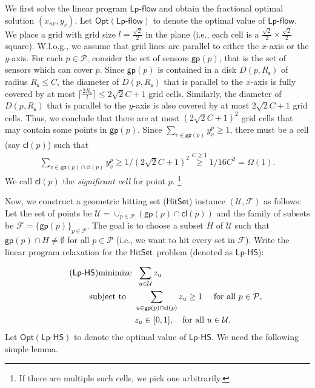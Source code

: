 \documentclass[11pt]{article}
\newcommand{\calF}{{\mathcal F}}
\newcommand{\calP}{{\mathcal P}}
\newcommand{\calU}{{\mathcal U}}
\newcommand{\opt}{\mathsf{Opt}}
\newcommand{\rednote}[1]{#1}
\newcommand{\hittingset}{$\mathsf{HitSet}$}
\newcommand{\lpflow}{\mathsf{Lp}\text{-}\mathsf{flow}}
\newcommand{\lphittingset}{\mathsf{Lp}\text{-}\mathsf{HS}}
\newcommand{\group}{\mathsf{gp}}
\newcommand{\cell}{\mathsf{cl}}
\newcommand{\Rs}{R_\mathsf{s}}
\begin{document}
We first solve the linear program $\lpflow$ and obtain the fractional optimal solution
$(x_{uv}, y_v)$.
Let $\opt(\lpflow)$ to denote the optimal value of $\lpflow$.
We place a grid with grid size $l=\frac{\sqrt{2}}{2}$ in the plane (i.e., each cell is a $\frac{\sqrt{2}}{2}\times \frac{\sqrt{2}}{2}$ square).
W.l.o.g., we assume that grid lines are parallel to either the $x$-axis or the $y$-axis.
For each $p\in \calP$, consider the set of sensors $\group(p)$, that is the set of sensors which can cover $p$.
Since $\group(p)$ is contained in a disk $D(p, \Rs)$ of radius $\Rs\leq C$, the diameter of $D(p,\Rs)$ that is parallel to the $x$-axis is fully covered by at most $\lceil \frac{2\Rs}{l} \rceil\leq 2\sqrt{2} C +1$ grid cells.
Similarly, the diameter of $D(p,\Rs)$ that is parallel to the $y$-axis is also covered by at most $2\sqrt{2} C +1$ grid cells.
Thus, we conclude that there are at most
\rednote{$(2\sqrt{2} C +1)^2$} grid cells that may contain some points in $\group(p)$.
Since  $\sum_{v\in \group(p)}y^p_v\geq 1$, there must be a cell (say $\cell(p)$) such that
\begin{align}
\label{eq:cellsum}
\sum_{v\in \group(p)\cap \cell(p)} y^p_v\geq 1/(2\sqrt{2} C +1)^2\stackrel{C\geq 1}{\geq} 1/16C^2 =\Omega(1).
\end{align}
We call $\cell(p)$ the {\em significant cell} for point $p$. 
\footnote{
	If there are multiple such cells, we pick one arbitrarily.
}


Now, we construct a geometric hitting set (\hittingset) instance $(\calU, \calF)$ as follows:
Let the set of points be
$
\calU=\cup_{p\in \calP} (\group(p)\cap\cell(p))
$
and  the family of subsets be
$
\calF=\{\group(p)\}_{p\in \calP}.
$
The goal is to choose a subset $H$ of $\calU$ such that
$\group(p)\cap H\ne \emptyset$ for all $p\in \calP$ (i.e., we want to hit every set in $\calF$).
Write the linear program relaxation for the \hittingset\ problem (denoted as $\lphittingset$):

\begin{align}
\label{eq:lpgst}
\tag{$\lphittingset$}
\mathrm{minimize} \,\, & \,\, \sum_{u\in \calU} z_u \\
\mathrm{subject\,\, to} \quad & \sum_{u\in \group(p)\cap \cell(p)}z_u\geq 1                              \quad \text{ for all }p\in \calP, \notag \\
& z_u\in [0,1],                                        \quad \text{for all } u \in \calU \notag.
\end{align}
Let $\opt(\lphittingset)$ to denote the optimal value of $\lphittingset$.
We need the following simple lemma.
\end{document}
